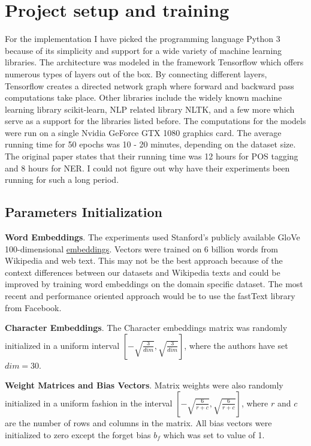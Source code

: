 \section{Project setup and training}
For the implementation I have picked the programming language
Python 3 because of its simplicity and support for a wide variety of
machine learning libraries. The architecture was modeled in the framework
Tensorflow which offers numerous types of layers out of the box. By connecting
different layers, Tensorflow creates a directed network graph where forward
and backward pass computations take place. Other libraries include the widely known
machine learning library scikit-learn\cite{pedregosa2011scikit}, NLP related library
NLTK, and a few more which serve as a support for the libraries
listed before. The computations for the models were run on a single Nvidia GeForce
GTX 1080 graphics card. The average running time for 50 epochs was 10
- 20 minutes, depending on the dataset size. The original paper states that
their running time was 12 hours for POS tagging and 8 hours for NER. I could
not figure out why have their experiments been running for such a long period.

\subsection{Parameters Initialization}
\textbf{Word Embeddings}. The experiments used Stanford's publicly
available GloVe 100-dimensional
\href{http://nlp.stanford.edu/projects/glove/}{embeddings}. Vectors were
trained on 6 billion words from Wikipedia and web text\cite{pennington2014glove}. This may
not be the best approach because of the context differences between our
datasets and Wikipedia texts and could be improved by training word embeddings
on the domain specific dataset. The most recent and performance oriented approach
would be to use the fastText\cite{bojanowski2016enriching} library from
Facebook.

\textbf{Character Embeddings}. The Character embeddings matrix was randomly initialized
in a uniform interval $\left[-\sqrt{\frac{3}{dim}},
\sqrt{\frac{3}{dim}}\right]$, where the authors have set $dim = 30$.

\textbf{Weight Matrices and Bias Vectors}. Matrix weights were also randomly
initialized in a uniform fashion in the interval $\left[-\sqrt{\frac{6}{r+c}},
\sqrt{\frac{6}{r+c}}\right]$, where $r$ and $c$ are the number of rows and
columns in the matrix. All bias vectors were initialized
to zero except the forget bias $b_f$ which was set to value of 1.

